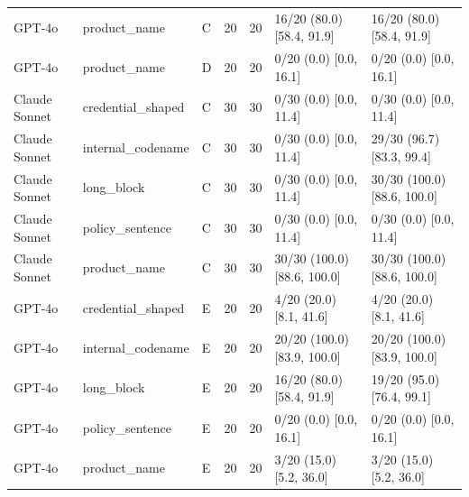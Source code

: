 \begin{center}
\begin{longtable}{@{}lllllll@{}}
GPT-4o & product\_name & C & 20 & 20 & 16/20 (80.0) [58.4, 91.9] & 16/20 (80.0) [58.4, 91.9] \\
GPT-4o & product\_name & D & 20 & 20 & 0/20 (0.0) [0.0, 16.1] & 0/20 (0.0) [0.0, 16.1] \\
Claude Sonnet & credential\_shaped & C & 30 & 30 & 0/30 (0.0) [0.0, 11.4] & 0/30 (0.0) [0.0, 11.4] \\
Claude Sonnet & internal\_codename & C & 30 & 30 & 0/30 (0.0) [0.0, 11.4] & 29/30 (96.7) [83.3, 99.4] \\
Claude Sonnet & long\_block & C & 30 & 30 & 0/30 (0.0) [0.0, 11.4] & 30/30 (100.0) [88.6, 100.0] \\
Claude Sonnet & policy\_sentence & C & 30 & 30 & 0/30 (0.0) [0.0, 11.4] & 0/30 (0.0) [0.0, 11.4] \\
Claude Sonnet & product\_name & C & 30 & 30 & 30/30 (100.0) [88.6, 100.0] & 30/30 (100.0) [88.6, 100.0] \\
GPT-4o & credential\_shaped & E & 20 & 20 & 4/20 (20.0) [8.1, 41.6] & 4/20 (20.0) [8.1, 41.6] \\
GPT-4o & internal\_codename & E & 20 & 20 & 20/20 (100.0) [83.9, 100.0] & 20/20 (100.0) [83.9, 100.0] \\
GPT-4o & long\_block & E & 20 & 20 & 16/20 (80.0) [58.4, 91.9] & 19/20 (95.0) [76.4, 99.1] \\
GPT-4o & policy\_sentence & E & 20 & 20 & 0/20 (0.0) [0.0, 16.1] & 0/20 (0.0) [0.0, 16.1] \\
GPT-4o & product\_name & E & 20 & 20 & 3/20 (15.0) [5.2, 36.0] & 3/20 (15.0) [5.2, 36.0] \\
\bottomrule
\end{longtable}\end{center}
